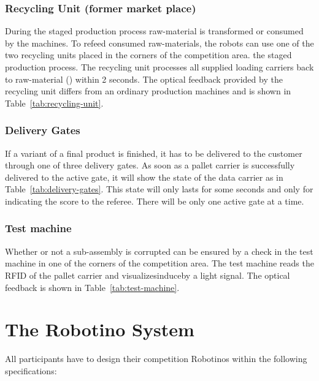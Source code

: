 \documentclass[12pt,twoside]{article}
\begin{document}
\subsubsection{Recycling Unit (former market place)}
During the staged production process raw-material is transformed or consumed by
the machines. To refeed consumed raw-materials, the robots can use one of the
two recycling units placed in the corners of the competition area. the staged
production process. The recycling unit processes all supplied loading carriers
back to raw-material () within 2 seconds. The optical feedback provided by
the recycling unit differs from an ordinary production machines and is shown in
Table~\ref{tab:recycling-unit}.

\subsubsection{Delivery Gates} 

If a variant of a final product is finished, it has to be delivered to the
customer through one of three delivery gates. As soon as a pallet carrier is
successfully delivered to the active gate, it will show the state of the data
carrier as in Table~\ref{tab:delivery-gates}. This state will only lasts for
some seconds and only for indicating the score to the referee. There will be
only one active gate at a time.

\subsubsection{Test machine}

Whether or not a sub-assembly is corrupted can be ensured by a check in the test
machine in one of the corners of the competition area. The test machine reads
the RFID of the pallet carrier and visualizesinduceby a light signal. The
optical feedback is shown in Table~\ref{tab:test-machine}.


\section{The Robotino System} \label{sec:robotino}

All participants have to design their competition Robotinos within
the following specifications:
\end{document}
